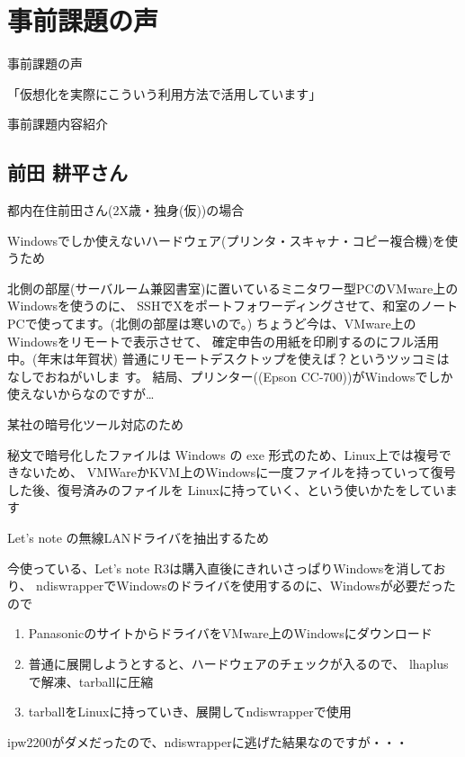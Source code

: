 \documentclass[cjk,dvipdfmx]{beamer}
\begin{document}
\section{事前課題の声}
\begin{frame}{事前課題の声}

「仮想化を実際にこういう利用方法で活用しています」
 
 事前課題内容紹介

\end{frame}




\subsection{前田 耕平さん}

\begin{frame}{}
 都内在住前田さん(2X歳・独身(仮))の場合
\end{frame}

\begin{frame}
{Windowsでしか使えないハードウェア(プリンタ・スキャナ・コピー複合機)を使うため}

 北側の部屋(サーバルーム兼図書室)に置いているミニタワー型PCのVMware上のWindowsを使うのに、
 SSHでXをポートフォワーディングさせて、和室のノートPCで使ってます。(北側の部屋は寒いので。)
 ちょうど今は、VMware上のWindowsをリモートで表示させて、
 確定申告の用紙を印刷するのにフル活用中。(年末は年賀状)
 普通にリモートデスクトップを使えば？というツッコミはなしでおねがいしま
 す。
 結局、プリンター((Epson CC-700))がWindowsでしか使えないからなのですが…
\end{frame}

\begin{frame}
{某社の暗号化ツール対応のため}

 秘文で暗号化したファイルは Windows の exe 形式のため、Linux上では複号で
 きないため、
 VMWareかKVM上のWindowsに一度ファイルを持っていって復号した後、復号済みのファイルを
 Linuxに持っていく、という使いかたをしています

\end{frame}

\begin{frame}
{Let's note の無線LANドライバを抽出するため}

 今使っている、Let's note R3は購入直後にきれいさっぱりWindowsを消しており、
 ndiswrapperでWindowsのドライバを使用するのに、Windowsが必要だったので
 
\begin{enumerate}
 \item PanasonicのサイトからドライバをVMware上のWindowsにダウンロード
 \item 普通に展開しようとすると、ハードウェアのチェックが入るので、
       lhaplusで解凍、tarballに圧縮
 \item tarballをLinuxに持っていき、展開してndiswrapperで使用
\end{enumerate}

 ipw2200がダメだったので、ndiswrapperに逃げた結果なのですが・・・
\end{frame}
\end{document}
